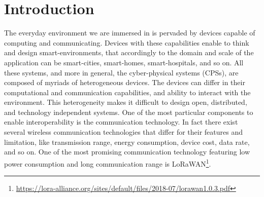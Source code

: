 \chapter{Introduction}
\label{chap:introduction}
The everyday environment we are immersed in is pervaded by devices capable of computing and communicating.
Devices with these capabilities enable to think and design smart-environments, that accordingly to the domain and scale of the application can be smart-cities, smart-homes, smart-hospitals, and so on.
All these systems, and more in general, the cyber-physical systems (CPSs), are composed of myriads of heterogeneous devices.
The devices can differ in their computational and communication capabilities, and ability to interact with the environment.
This heterogeneity makes it difficult to design open, distributed, and technology independent systems. 
One of the most particular components to enable interoperability is the communication technology.
In fact there exist several wireless communication technologies that differ for their features and limitation, like transmission range, energy consumption, device cost, data rate, and so on.
One of the most promising communication technology featuring low power consumption and long communication range is \mbox{LoRaWAN}\footnote{\href{https://lora-alliance.org/sites/default/files/2018-07/lorawan1.0.3.pdf}{https://lora-alliance.org/sites/default/files/2018-07/lorawan1.0.3.pdf}}.

